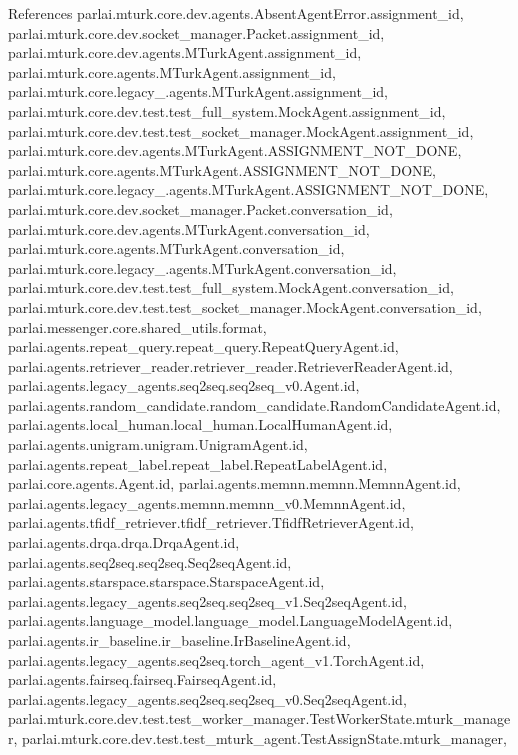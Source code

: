 References parlai.\+mturk.\+core.\+dev.\+agents.\+Absent\+Agent\+Error.\+assignment\+\_\+id, parlai.\+mturk.\+core.\+dev.\+socket\+\_\+manager.\+Packet.\+assignment\+\_\+id, parlai.\+mturk.\+core.\+dev.\+agents.\+M\+Turk\+Agent.\+assignment\+\_\+id, parlai.\+mturk.\+core.\+agents.\+M\+Turk\+Agent.\+assignment\+\_\+id, parlai.\+mturk.\+core.\+legacy\+\_.\+agents.\+M\+Turk\+Agent.\+assignment\+\_\+id, parlai.\+mturk.\+core.\+dev.\+test.\+test\+\_\+full\+\_\+system.\+Mock\+Agent.\+assignment\+\_\+id, parlai.\+mturk.\+core.\+dev.\+test.\+test\+\_\+socket\+\_\+manager.\+Mock\+Agent.\+assignment\+\_\+id, parlai.\+mturk.\+core.\+dev.\+agents.\+M\+Turk\+Agent.\+A\+S\+S\+I\+G\+N\+M\+E\+N\+T\+\_\+\+N\+O\+T\+\_\+\+D\+O\+NE, parlai.\+mturk.\+core.\+agents.\+M\+Turk\+Agent.\+A\+S\+S\+I\+G\+N\+M\+E\+N\+T\+\_\+\+N\+O\+T\+\_\+\+D\+O\+NE, parlai.\+mturk.\+core.\+legacy\+\_.\+agents.\+M\+Turk\+Agent.\+A\+S\+S\+I\+G\+N\+M\+E\+N\+T\+\_\+\+N\+O\+T\+\_\+\+D\+O\+NE, parlai.\+mturk.\+core.\+dev.\+socket\+\_\+manager.\+Packet.\+conversation\+\_\+id, parlai.\+mturk.\+core.\+dev.\+agents.\+M\+Turk\+Agent.\+conversation\+\_\+id, parlai.\+mturk.\+core.\+agents.\+M\+Turk\+Agent.\+conversation\+\_\+id, parlai.\+mturk.\+core.\+legacy\+\_.\+agents.\+M\+Turk\+Agent.\+conversation\+\_\+id, parlai.\+mturk.\+core.\+dev.\+test.\+test\+\_\+full\+\_\+system.\+Mock\+Agent.\+conversation\+\_\+id, parlai.\+mturk.\+core.\+dev.\+test.\+test\+\_\+socket\+\_\+manager.\+Mock\+Agent.\+conversation\+\_\+id, parlai.\+messenger.\+core.\+shared\+\_\+utils.\+format, parlai.\+agents.\+repeat\+\_\+query.\+repeat\+\_\+query.\+Repeat\+Query\+Agent.\+id, parlai.\+agents.\+retriever\+\_\+reader.\+retriever\+\_\+reader.\+Retriever\+Reader\+Agent.\+id, parlai.\+agents.\+legacy\+\_\+agents.\+seq2seq.\+seq2seq\+\_\+v0.\+Agent.\+id, parlai.\+agents.\+random\+\_\+candidate.\+random\+\_\+candidate.\+Random\+Candidate\+Agent.\+id, parlai.\+agents.\+local\+\_\+human.\+local\+\_\+human.\+Local\+Human\+Agent.\+id, parlai.\+agents.\+unigram.\+unigram.\+Unigram\+Agent.\+id, parlai.\+agents.\+repeat\+\_\+label.\+repeat\+\_\+label.\+Repeat\+Label\+Agent.\+id, parlai.\+core.\+agents.\+Agent.\+id, parlai.\+agents.\+memnn.\+memnn.\+Memnn\+Agent.\+id, parlai.\+agents.\+legacy\+\_\+agents.\+memnn.\+memnn\+\_\+v0.\+Memnn\+Agent.\+id, parlai.\+agents.\+tfidf\+\_\+retriever.\+tfidf\+\_\+retriever.\+Tfidf\+Retriever\+Agent.\+id, parlai.\+agents.\+drqa.\+drqa.\+Drqa\+Agent.\+id, parlai.\+agents.\+seq2seq.\+seq2seq.\+Seq2seq\+Agent.\+id, parlai.\+agents.\+starspace.\+starspace.\+Starspace\+Agent.\+id, parlai.\+agents.\+legacy\+\_\+agents.\+seq2seq.\+seq2seq\+\_\+v1.\+Seq2seq\+Agent.\+id, parlai.\+agents.\+language\+\_\+model.\+language\+\_\+model.\+Language\+Model\+Agent.\+id, parlai.\+agents.\+ir\+\_\+baseline.\+ir\+\_\+baseline.\+Ir\+Baseline\+Agent.\+id, parlai.\+agents.\+legacy\+\_\+agents.\+seq2seq.\+torch\+\_\+agent\+\_\+v1.\+Torch\+Agent.\+id, parlai.\+agents.\+fairseq.\+fairseq.\+Fairseq\+Agent.\+id, parlai.\+agents.\+legacy\+\_\+agents.\+seq2seq.\+seq2seq\+\_\+v0.\+Seq2seq\+Agent.\+id, parlai.\+mturk.\+core.\+dev.\+test.\+test\+\_\+worker\+\_\+manager.\+Test\+Worker\+State.\+mturk\+\_\+manager, parlai.\+mturk.\+core.\+dev.\+test.\+test\+\_\+mturk\+\_\+agent.\+Test\+Assign\+State.\+mturk\+\_\+manager, 